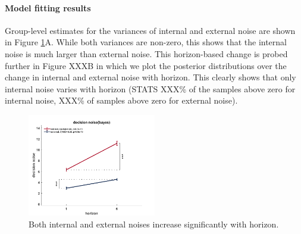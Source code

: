 \documentclass[12pt]{article}
\begin{document}
	
	
	
	
	
	\paragraph{Model fitting results} 
	
	Group-level estimates for the variances of internal and external noise are shown in Figure \ref{fig:modelbased}A.  While both variances are non-zero, this shows that the internal noise is much larger than external noise. This horizon-based change is probed further in Figure XXXB in which we plot the posterior distributions over the change in internal and external noise with horizon.  This clearly shows that only internal noise varies with horizon (STATS XXX\% of the samples above zero for internal noise, XXX\% of samples above zero for external noise).
	
	
	
	\begin{figure}[H]
		\begin{center}
			\includegraphics[width=0.5\textwidth]{figures/bayes.png}
			\caption{Both internal and external noises increase significantly with horizon.}
			\label{fig:modelbased}
		\end{center}
	\end{figure}
	
\end{document}
